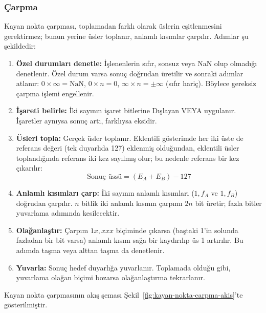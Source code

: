 \subsubsection{Çarpma}

Kayan nokta çarpması, toplamadan farklı olarak üslerin eşitlenmesini gerektirmez; bunun yerine üsler toplanır, anlamlı kısımlar çarpılır. Adımlar şu şekildedir:

\begin{enumerate}
\item \textbf{Özel durumları denetle:} İşlenenlerin sıfır, sonsuz veya NaN olup olmadığı denetlenir. Özel durum varsa sonuç doğrudan üretilir ve sonraki adımlar atlanır: $0 \times \infty = \text{NaN}$, $0 \times n = 0$, $\infty \times n = \pm\infty$ (sıfır hariç). Böylece gereksiz çarpma işlemi engellenir.

\item \textbf{İşareti belirle:} İki sayının işaret bitlerine Dışlayan VEYA uygulanır. İşaretler aynıysa sonuç artı, farklıysa eksidir.

\item \textbf{Üsleri topla:} Gerçek üsler toplanır. Eklentili gösterimde her iki üste de referans değeri (tek duyarlıda 127) eklenmiş olduğundan, eklentili üsler toplandığında referans iki kez sayılmış olur; bu nedenle referans bir kez çıkarılır:
\[
\text{Sonuç üssü} = (E_A + E_B) - 127
\]

\item \textbf{Anlamlı kısımları çarp:} İki sayının anlamlı kısımları ($1{,}f_A$ ve $1{,}f_B$) doğrudan çarpılır. $n$ bitlik iki anlamlı kısmın çarpımı $2n$ bit üretir; fazla bitler yuvarlama adımında kesilecektir.

\item \textbf{Olağanlaştır:} Çarpım $1x{,}xxx$ biçiminde çıkarsa (baştaki 1'in solunda fazladan bir bit varsa) anlamlı kısım sağa bir kaydırılıp üs 1 artırılır. Bu adımda taşma veya alttan taşma da denetlenir.

\item \textbf{Yuvarla:} Sonuç hedef duyarlığa yuvarlanır. Toplamada olduğu gibi, yuvarlama olağan biçimi bozarsa olağanlaştırma tekrarlanır.
\end{enumerate}

Kayan nokta çarpmasının akış şeması Şekil~\ref{fig:kayan-nokta-carpma-akis}'te gösterilmiştir.

